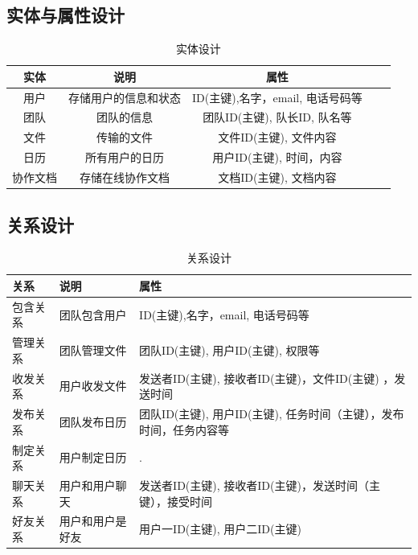 \subsection{实体与属性设计}
\begin{table}[htbp]
\centering
\caption{实体设计} \label{tab:client-database}
\begin{tabular}{|c|c|c|c|c|}
    \hline
    实体 & 说明 & 属性 \\
    \hline
    用户 & 存储用户的信息和状态 & ID(主键),名字，email, 电话号码等 \\
    \hline
    团队 & 团队的信息 & 团队ID(主键), 队长ID, 队名等 \\
    \hline
    文件 & 传输的文件 & 文件ID(主键), 文件内容 \\
    \hline
    日历 & 所有用户的日历 & 用户ID(主键), 时间，内容 \\
    \hline 
    协作文档 & 存储在线协作文档 & 文档ID(主键), 文档内容 \\
    \hline
\end{tabular}
\end{table}

\subsection{关系设计}
\newpage
\begin{table}[htbp]
\centering
\caption{关系设计} \label{tab:client-database}
\begin{tabular}{|p{4em}|p{8em}|p{20em}|}
    \hline
    关系 & 说明 & 属性 \\
    \hline
    包含关系 & 团队包含用户 & ID(主键),名字，email, 电话号码等 \\
    \hline
    管理关系 & 团队管理文件 & 团队ID(主键), 用户ID(主键), 权限等 \\
    \hline 
    收发关系 & 用户收发文件 & 发送者ID(主键), 接收者ID(主键)，文件ID(主键) ，发送时间\\
    \hline
    发布关系 & 团队发布日历 & 团队ID(主键), 用户ID(主键), 任务时间（主键），发布时间，任务内容等 \\
    \hline
    制定关系 & 用户制定日历 & . \\
    \hline 
    聊天关系 & 用户和用户聊天 & 发送者ID(主键), 接收者ID(主键)，发送时间（主键），接受时间 \\
    \hline 
    好友关系 & 用户和用户是好友 & 用户一ID(主键), 用户二ID(主键) \\
    
    \hline
\end{tabular}
\end{table}
